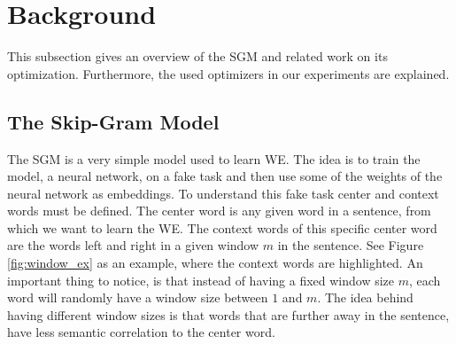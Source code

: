 



\section{Background}\label{chap:background}
This subsection gives an overview of the SGM and related work on its optimization. Furthermore, the used optimizers in our experiments are explained.
\subsection{The Skip-Gram Model}
The SGM is a very simple model used to learn WE. The idea is to train the model, a neural network, on a fake task and then use some of the weights of the neural network as embeddings. To understand this fake task center and context words must be defined. The center word is any given word in a sentence, from which we want to learn the WE. The context words of this specific center word are the words left and right in a given window $m$ in the sentence. See Figure \ref{fig:window_ex} as an example, where the context words are highlighted. An important thing to notice, is that instead of having a fixed window size $m$, each word will randomly have a window size between $1$ and $m$. The idea behind having different window sizes is that words that are further away in the sentence, have less semantic correlation to the center word.

